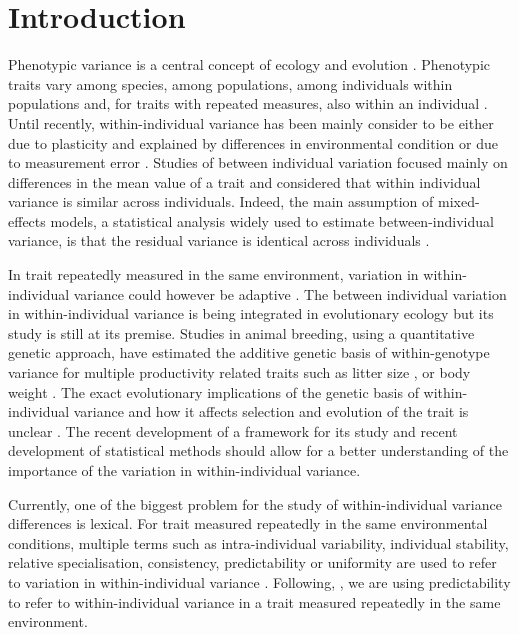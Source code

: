\documentclass[a4paper,12pt,twoside]{article}
\begin{document}
	\newpage
	\section*{Introduction}
	Phenotypic variance is a central concept of ecology and evolution \citep{Roff2002}.
	Phenotypic traits vary among species, among populations, among individuals within populations and, for traits with repeated measures, also within an individual \citep{Roff2002}. 
	Until recently, within-individual variance has been mainly consider to be either due to plasticity and explained by differences in environmental condition \citep{Pigliucci2005, Nussey2007} or due to measurement error \citep{Pigliucci2005, Westneat2014}.
	Studies of between individual variation focused mainly on differences in the mean value of a trait and considered that within individual variance is similar across individuals.
	Indeed, the main assumption of mixed-effects models, a statistical analysis widely used to estimate between-individual variance, is that the residual variance is identical across individuals \citep{Pinheiro2000, Dingemanse2013}. 
	
	In trait repeatedly measured in the same environment, variation in within-individual variance could however be adaptive \citep{Westneat2014, Hill2010}.
	The between individual variation in within-individual variance is being integrated in evolutionary ecology \citep{Mulder2007, Nussey2007} but its study is still at its premise. 
	Studies in animal breeding, using a quantitative genetic approach, have estimated the additive genetic basis of within-genotype variance for multiple productivity related traits such as litter size \citep{Hill2010}, or body weight \citep{Sae-lim2015}.
	The exact evolutionary implications of the genetic basis of within-individual variance and how it affects selection and evolution of the trait is unclear \citep[but see ][]{Mulder2015}.
	The recent development of a framework for its study \citep{Westneat2014, Hill2010} and recent development of statistical methods \cite{Cleasby2015, Mulder2015} should allow for a better understanding of the importance of the variation in within-individual variance.
	
	Currently, one of the biggest problem for the study of within-individual variance differences is lexical. 
	For trait measured repeatedly in the same environmental conditions, multiple terms such as intra-individual variability, individual stability, relative specialisation, consistency, predictability or uniformity are used to refer to variation in within-individual variance \citep{Stamps2012, Cleasby2015, Sae-lim2015}.
	Following, \cite{Cleasby2015}, we are using predictability to refer to within-individual variance in a trait measured repeatedly in the same environment.
	
\end{document}
